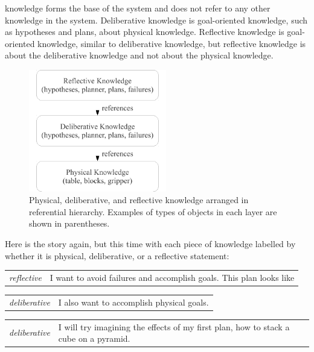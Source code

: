 knowledge forms the base of the system and does not refer to any other
knowledge in the system.  Deliberative knowledge is goal-oriented
knowledge, such as hypotheses and plans, about physical knowledge.
Reflective knowledge is goal-oriented knowledge, similar to
deliberative knowledge, but reflective knowledge is about the
deliberative knowledge and not about the physical knowledge.
\begin{figure}
  \center
  \includegraphics[width=6cm]{gfx/physical_deliberative_reflective_knowledge}
  \caption{Physical, deliberative, and reflective knowledge arranged
    in referential hierarchy.  Examples of types of objects in each
    layer are shown in parentheses.}
  \label{figure:physical_deliberative_reflective_knowledge}
\end{figure}









Here is the story again, but this time with each piece of knowledge
labelled by whether it is physical, deliberative, or a reflective
statement:

\begin{tabular}{p{2cm}p{8cm}}
  {\emph{reflective}} & I want to avoid failures and accomplish goals.
  This plan looks like \\
\end{tabular}

\begin{tabular}{p{2cm}p{8cm}}
  {\emph{deliberative}} & I also want to accomplish physical goals. \\
\end{tabular}

\begin{tabular}{p{2cm}p{8cm}}
  {\emph{deliberative}} & I will try imagining the effects of my first
  plan, how to stack a cube on a pyramid. \\
\end{tabular}

